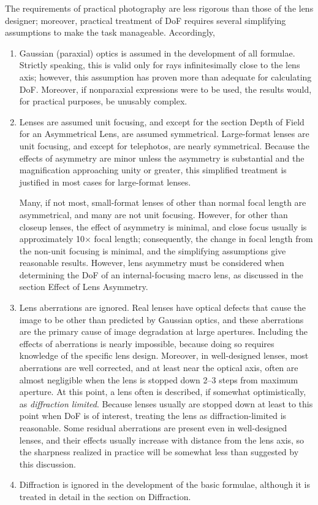 \documentclass[11pt, oneside]{scrartcl}   	%
\begin{document}
The requirements of practical photography are less rigorous than those of the lens designer; moreover, practical treatment of DoF requires several simplifying assumptions to make the task manageable. Accordingly,
\begin{enumerate}
\item Gaussian (paraxial) optics is assumed in the development of all formulae. Strictly speaking, this is valid only for rays infinitesimally close to the lens axis; however, this assumption has proven more than adequate for calculating DoF. Moreover, if nonparaxial expressions were to be used, the results would, for practical purposes, be unusably complex.
\item Lenses are assumed unit focusing, and except for the section Depth of Field for an Asymmetrical Lens, are assumed symmetrical. Large-format lenses are unit focusing,
and except for telephotos, are nearly symmetrical. Because the effects of asymmetry are minor unless the asymmetry is substantial and the magnification approaching unity or greater, this simplified treatment is justified in most cases for large-format lenses.

Many, if not most, small-format lenses of other than normal focal length are asymmetrical, and many are not unit focusing. However, for other than closeup lenses, the effect of asymmetry is minimal, and close focus usually is approximately 10$\times$ focal length; consequently, the change in focal length from the non-unit focusing is minimal, and the simplifying assumptions give reasonable results. However, lens asymmetry must be considered when determining the DoF of an internal-focusing macro lens, as discussed in the section Effect of Lens Asymmetry.
\item Lens aberrations are ignored. Real lenses have optical defects that cause the image to be other than predicted by Gaussian optics, and these aberrations are the primary cause of image degradation at large apertures. Including the effects of aberrations is nearly impossible, because doing so requires knowledge of the specific lens design. Moreover, in well-designed lenses, most aberrations are well corrected, and at least near the optical axis, often are almost negligible when the lens is stopped down 2--3 steps from maximum aperture. At this point, a lens often is described, if somewhat optimistically, as \emph{diffraction limited}. Because lenses usually are stopped down at least to this point when DoF is of interest, treating the lens as diffraction-limited is reasonable. Some residual aberrations are present even in well-designed lenses, and their effects usually increase with distance from the lens axis, so the sharpness realized in practice will be somewhat less than suggested by this discussion.
\item Diffraction is ignored in the development of the basic formulae, although it is treated in detail in the section on Diffraction.
\end{enumerate}
\end{document}
